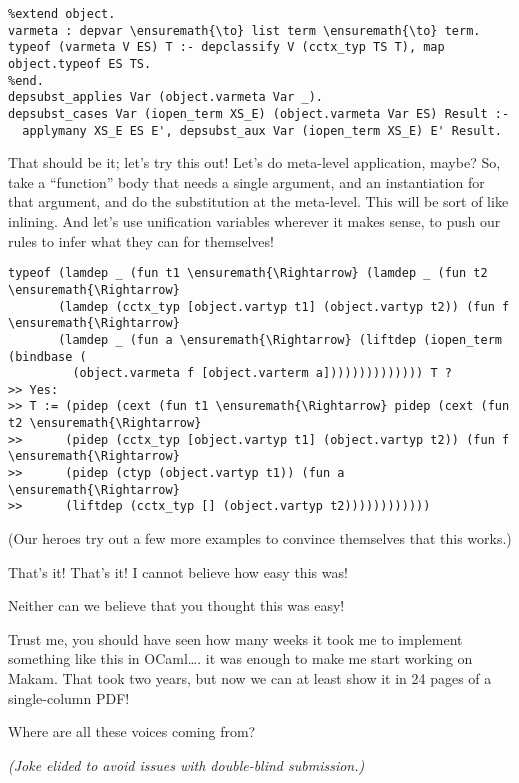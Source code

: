 \vspace{-0.5em}

\begin{verbatim}
%extend object.
varmeta : depvar \ensuremath{\to} list term \ensuremath{\to} term.
typeof (varmeta V ES) T :- depclassify V (cctx_typ TS T), map object.typeof ES TS.
%end.
depsubst_applies Var (object.varmeta Var _).
depsubst_cases Var (iopen_term XS_E) (object.varmeta Var ES) Result :-
  applymany XS_E ES E', depsubst_aux Var (iopen_term XS_E) E' Result.
\end{verbatim}

\heroADVISOR{} That should be it; let's try this out! Let's do meta-level
application, maybe? So, take a ``function'' body that needs a single
argument, and an instantiation for that argument, and do the
substitution at the meta-level. This will be sort of like inlining. And
let's use unification variables wherever it makes sense, to push our
rules to infer what they can for themselves!

\begin{verbatim}
typeof (lamdep _ (fun t1 \ensuremath{\Rightarrow} (lamdep _ (fun t2 \ensuremath{\Rightarrow}
       (lamdep (cctx_typ [object.vartyp t1] (object.vartyp t2)) (fun f \ensuremath{\Rightarrow}
       (lamdep _ (fun a \ensuremath{\Rightarrow} (liftdep (iopen_term (bindbase (
         (object.varmeta f [object.varterm a]))))))))))))) T ?
>> Yes:
>> T := (pidep (cext (fun t1 \ensuremath{\Rightarrow} pidep (cext (fun t2 \ensuremath{\Rightarrow}
>>      (pidep (cctx_typ [object.vartyp t1] (object.vartyp t2)) (fun f \ensuremath{\Rightarrow}
>>      (pidep (ctyp (object.vartyp t1)) (fun a \ensuremath{\Rightarrow}
>>      (liftdep (cctx_typ [] (object.vartyp t2))))))))))))
\end{verbatim}

\begin{scenecomment}
(Our heroes try out a few more examples to convince themselves that this works.)
\end{scenecomment}

\heroSTUDENT{} That's it! That's it! I cannot believe how easy this was!

\heroAUDIENCE{} Neither can we believe that you thought this was easy!

\heroAUTHOR{} Trust me, you should have seen how many weeks it took me to
implement something like this in OCaml\ldots{}. it was enough to make me
start working on Makam. That took two years, but now we can at least
show it in 24 pages of a single-column PDF!

\heroADVISOR{} Where are all these voices coming from?

\heroSTUDENT{}
\textit{(Joke elided to avoid issues with double-blind submission.)}
